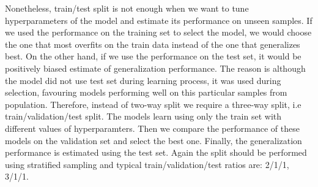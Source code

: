 \documentclass[shortabstract, english, mgr]{iithesis}
\begin{document}
Nonetheless, train/test split is not enough when we want to tune hyperparameters of the model and estimate its performance on unseen samples. If we used the performance on the training set to select the model, we would choose the one that most overfits on the train data instead of the one that generalizes best. On the other hand, if we use the performance on the test set, it would be positively biased estimate of generalization performance. The reason is although the model did not use test set during learning process, it was used during selection, favouring models performing well on this particular samples from population. Therefore, instead of two-way split we require a three-way split, i.e train/validation/test split. The models learn using only the train set with different values of hyperparamters. Then we compare the performance of these models on the validation set and select the best one. Finally, the generalization performance is estimated using the test set. Again the split should be performed using stratified sampling and typical train/validation/test ratios are: 2/1/1, 3/1/1.
\end{document}
